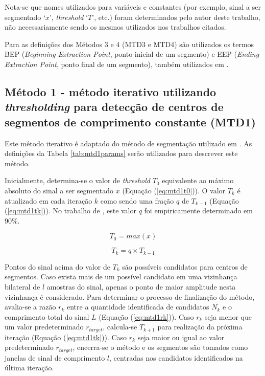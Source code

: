Nota-se que nomes utilizados para variáveis e constantes (por exemplo, sinal a ser segmentado `$x$', \emph{threshold} `$T$', etc.) foram determinados pelo autor deste trabalho, não necessariamente sendo os mesmos utilizados nos trabalhos citados.

Para as definições dos Métodos 3 e 4 (MTD3 e MTD4) são utilizados os termos BEP (\emph{Beginning Extraction Point}, ponto inicial de um segmento) e EEP (\emph{Ending Extraction Point}, ponto final de um segmento), também utilizados em .
	
				\subsection{Método 1 - método iterativo utilizando \emph{thresholding} para detecção de centros de segmentos de comprimento constante (MTD1)}
Este método iterativo é adaptado do método de segmentação utilizado em . As definições da Tabela \ref{tab:mtd1params} serão utilizados para descrever este método.



Inicialmente, determina-se o valor de \emph{threshold} $T_0$ equivalente ao máximo absoluto do sinal a ser segmentado $x$ (Equação (\ref{eq:mtd1t0})). O valor $T_k$ é atualizado em cada iteração $k$ como sendo uma fração $q$ de $T_{k-1}$ (Equação (\ref{eq:mtd1tk})). No trabalho de , este valor $q$ foi empiricamente determinado em 90\%.

\begin{equation}
\label{eq:mtd1t0}
  T_0 = max(x)
\end{equation}

\begin{equation}
\label{eq:mtd1tk}
  T_k = q \times T_{k-1}
\end{equation}

Pontos do sinal acima do valor de $T_k$ são possíveis candidatos para centros de segmentos. Caso exista mais de um possível candidato em uma vizinhança bilateral de $l$ amostras do sinal, apenas o ponto de maior amplitude nesta vizinhança é considerado. Para determinar o processo de finalização do método, avalia-se a razão $r_k$ entre a quantidade identificada de candidatos $N_{k}$ e o comprimento total do sinal $L$ (Equação (\ref{eq:mtd1rk})). Caso $r_k$ seja menor que um valor predeterminado $r_{target}$, calcula-se $T_{k+1}$ para realização da próxima iteração (Equação (\ref{eq:mtd1tk})). Caso $r_k$ seja maior ou igual ao valor predeterminado $r_{target}$, encerra-se o método e os segmentos são tomados como janelas de sinal de comprimento $l$, centradas nos candidatos identificados na última iteração.

